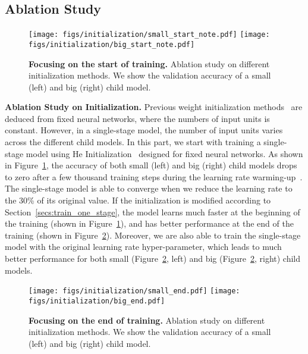 \documentclass[runningheads]{llncs}
\begin{document}
\subsection{Ablation Study}

\begin{figure}[ht]
\centering
\texttt{[image: figs/initialization/small\_start\_note.pdf]}
\texttt{[image: figs/initialization/big\_start\_note.pdf]}
\caption{\textbf{Focusing on the start of training.} Ablation study on different initialization methods. We show the validation accuracy of a small (left) and big (right) child model.}
\label{figs:initialization_start}
\end{figure}

\textbf{Ablation Study on Initialization.}
Previous weight initialization methods~\cite{he2015delving} are deduced from fixed neural networks, where the numbers of input units is constant. However, in a single-stage model, the number of input units varies across the different child models. In this part, we start with training a single-stage model using He Initialization~\cite{he2015delving} designed for fixed neural networks. As shown in Figure~\ref{figs:initialization_start}, the accuracy of both small (left) and big (right) child models drops to zero after a few thousand training steps during the learning rate warming-up~\cite{goyal2017accurate}. The single-stage model is able to converge when we reduce the learning rate to the 30\% of its original value. If the initialization is modified according to Section~\ref{secs:train_one_stage}, the model learns much faster at the beginning of the training (shown in Figure~\ref{figs:initialization_start}), and has better performance at the end of the training (shown in Figure~\ref{figs:initialization_end}). Moreover, we are also able to train the single-stage model with the original learning rate hyper-parameter, which leads to much better performance for both small (Figure~\ref{figs:initialization_end}, left) and big (Figure~\ref{figs:initialization_end}, right) child models.

\begin{figure}[ht]
\centering
\texttt{[image: figs/initialization/small\_end.pdf]}
\texttt{[image: figs/initialization/big\_end.pdf]}
\caption{\textbf{Focusing on the end of training.} Ablation study on different initialization methods. We show the validation accuracy of a small (left) and big (right) child model.}
\label{figs:initialization_end}
\end{figure}
\end{document}
